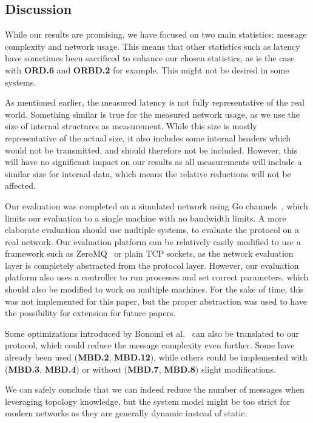 \subsection{Discussion}
While our results are promising, we have focused on two main statistics: message complexity and network usage. This means that other statistics such as latency have sometimes been sacrificed to enhance our chosen statistics, as is the case with \textbf{ORD.6} and \textbf{ORBD.2} for example. This might not be desired in some systems.

As mentioned earlier, the measured latency is not fully representative of the real world. Something similar is true for the measured network usage, as we use the size of internal structures as measurement. While this size is mostly representative of the actual size, it also includes some internal headers which would not be transmitted, and should therefore not be included. However, this will have no significant impact on our results as all measurements will include a similar size for internal data, which means the relative reductions will not be affected.

Our evaluation was completed on a simulated network using Go channels~\cite{channels}, which limits our evaluation to a single machine with no bandwidth limits. A more elaborate evaluation should use multiple systems, to evaluate the protocol on a real network. Our evaluation platform can be relatively easily modified to use a framework such as ZeroMQ~\cite{zeromq} or plain TCP sockets, as the network evaluation layer is completely abstracted from the protocol layer. However, our evaluation platform also uses a controller to run processes and set correct parameters, which should also be modified to work on multiple machines. For the sake of time, this was not implemented for this paper, but the proper abstraction was used to have the possibility for extension for future papers.

Some optimizations introduced by Bonomi et al.~\cite{bonomi2021practical} can also be translated to our protocol, which could reduce the message complexity even further. Some have already been used (\textbf{MBD.2}, \textbf{MBD.12}), while others could be implemented with (\textbf{MBD.3}, \textbf{MBD.4}) or without (\textbf{MBD.7}, \textbf{MBD.8}) slight modifications.

We can safely conclude that we can indeed reduce the number of messages when leveraging topology knowledge, but the system model might be too strict for modern networks as they are generally dynamic instead of static. 